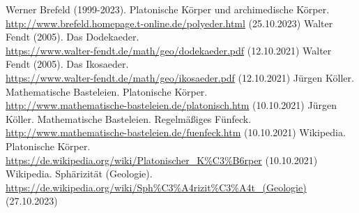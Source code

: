 \documentclass[11pt]{article}
\begin{document}
\begin{thebibliography}{xxx}
 Werner Brefeld (1999-2023). Platonische Körper und
  archimedische Körper.\\
  \url{http://www.brefeld.homepage.t-online.de/polyeder.html} (25.10.2023) 
 Walter Fendt (2005). Das Dodekaeder.\\
  \url{https://www.walter-fendt.de/math/geo/dodekaeder.pdf} (12.10.2021) 
 Walter Fendt (2005). Das Ikosaeder.\\
  \url{https://www.walter-fendt.de/math/geo/ikosaeder.pdf} (12.10.2021) 
 Jürgen Köller. Mathematische Basteleien.
  Platonische Körper.\\
  \url{http://www.mathematische-basteleien.de/platonisch.htm} (10.10.2021)
 Jürgen Köller. Mathematische Basteleien.
  Regelmäßiges Fünfeck.\\
  \url{http://www.mathematische-basteleien.de/fuenfeck.htm} (10.10.2021)
 Wikipedia. Platonische Körper.\\ 
  \url{https://de.wikipedia.org/wiki/Platonischer_K%C3%B6rper} (10.10.2021)
 Wikipedia. Sphärizität (Geologie).\\ 
  \url{https://de.wikipedia.org/wiki/Sph%C3%A4rizit%C3%A4t_(Geologie)}\\
    (27.10.2023)
\end{thebibliography}
\end{document}

